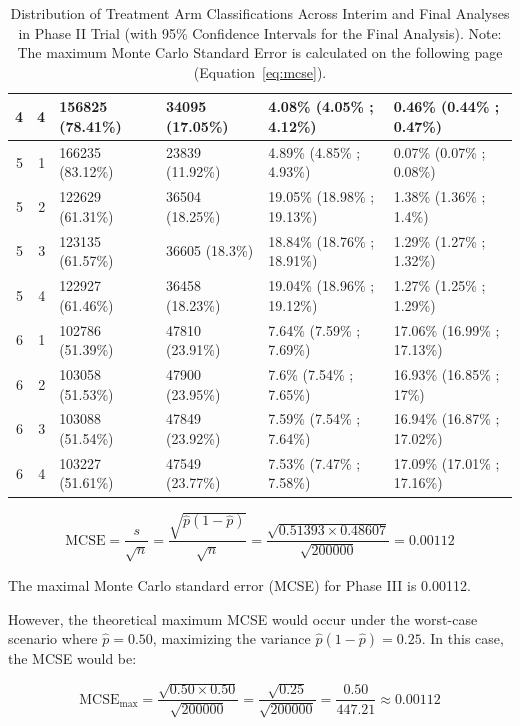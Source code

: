 \documentclass[11pt, a4paper]{article}\usepackage[]{graphicx}\usepackage[]{xcolor}
\begin{document}
\begin{landscape}
\begin{table}[ht]
\begin{tabular}{rrllll}
    4 &   4 & 156825 (78.41\%) & 34095 (17.05\%) & 4.08\% (4.05\% ; 4.12\%) & 0.46\% (0.44\% ; 0.47\%) \\ 
   \hline 
  5 &   1 & 166235 (83.12\%) & 23839 (11.92\%) & 4.89\% (4.85\% ; 4.93\%) & 0.07\% (0.07\% ; 0.08\%) \\ 
    5 &   2 & 122629 (61.31\%) & 36504 (18.25\%) & 19.05\% (18.98\% ; 19.13\%) & 1.38\% (1.36\% ; 1.4\%) \\ 
    5 &   3 & 123135 (61.57\%) & 36605 (18.3\%) & 18.84\% (18.76\% ; 18.91\%) & 1.29\% (1.27\% ; 1.32\%) \\ 
    5 &   4 & 122927 (61.46\%) & 36458 (18.23\%) & 19.04\% (18.96\% ; 19.12\%) & 1.27\% (1.25\% ; 1.29\%) \\ 
   \hline 
  6 &   1 & 102786 (51.39\%) & 47810 (23.91\%) & 7.64\% (7.59\% ; 7.69\%) & 17.06\% (16.99\% ; 17.13\%) \\ 
    6 &   2 & 103058 (51.53\%) & 47900 (23.95\%) & 7.6\% (7.54\% ; 7.65\%) & 16.93\% (16.85\% ; 17\%) \\ 
    6 &   3 & 103088 (51.54\%) & 47849 (23.92\%) & 7.59\% (7.54\% ; 7.64\%) & 16.94\% (16.87\% ; 17.02\%) \\ 
    6 &   4 & 103227 (51.61\%) & 47549 (23.77\%) & 7.53\% (7.47\% ; 7.58\%) & 17.09\% (17.01\% ; 17.16\%) \\ 
   \hline 
 \hline
\end{tabular}
\caption{Distribution of Treatment Arm Classifications Across Interim and Final Analyses in Phase II Trial (with 95\% Confidence Intervals for the Final Analysis). Note: The maximum Monte Carlo Standard Error is calculated on the following page (Equation~\ref{eq:mcse}).} 
\label{tab:outcome_distribution_phase2.1}
\end{table}

\end{landscape}

\begin{equation}
\text{MCSE} = \frac{s}{\sqrt{n}} = \frac{\sqrt{\hat{p}(1 - \hat{p})}}{\sqrt{n}} = \frac{\sqrt{0.51393 \times 0.48607}}{\sqrt{200000}} = 0.00112 \label{eq:mcse}
\end{equation}

The maximal Monte Carlo standard error (MCSE) for Phase III is 0.00112.

However, the theoretical maximum MCSE would occur under the worst-case scenario where
$\hat{p} = 0.50$, maximizing the variance $\hat{p}(1 - \hat{p}) = 0.25$. In this case, the MCSE would be:

\begin{equation}
\text{MCSE}_{\text{max}} = \frac{\sqrt{0.50 \times 0.50}}{\sqrt{200000}} = \frac{\sqrt{0.25}}{\sqrt{200000}} = \frac{0.50}{447.21} \approx 0.00112
\label{eq:mcse_max}
\end{equation}
\end{document}

